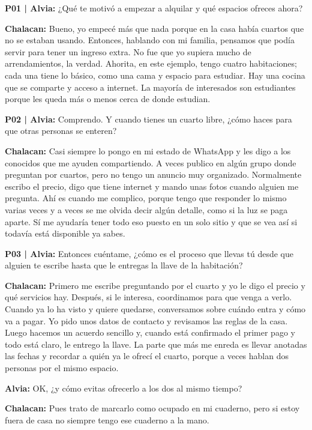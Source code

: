 \documentclass[11pt,a4paper]{article}
\newcommand{\habla}[2]{
    \par\noindent\hspace*{0.8em}\textbf{#1:} #2\par
}
\newcommand{\pregunta}[2]{
    \par\noindent\textbf{P#1 | Alvia:} #2\par
}
\begin{document}
\pregunta{01}{
¿Qué te motivó a empezar a alquilar y qué espacios ofreces ahora?
}

\habla{Chalacan}{
Bueno, yo empecé más que nada porque en la casa había cuartos que no se estaban usando. Entonces, hablando con mi familia, pensamos que podía servir para tener un ingreso extra. No fue que yo supiera mucho de arrendamientos, la verdad. Ahorita, en este ejemplo, tengo cuatro habitaciones; cada una tiene lo básico, como una cama y espacio para estudiar. Hay una cocina que se comparte y acceso a internet. La mayoría de interesados son estudiantes porque les queda más o menos cerca de donde estudian.
}


\pregunta{02}{
Comprendo. Y cuando tienes un cuarto libre, ¿cómo haces para que otras personas se enteren?
}

\habla{Chalacan}{
Casi siempre lo pongo en mi estado de WhatsApp y les digo a los conocidos que me ayuden compartiendo. A veces publico en algún grupo donde preguntan por cuartos, pero no tengo un anuncio muy organizado. Normalmente escribo el precio, digo que tiene internet y mando unas fotos cuando alguien me pregunta. Ahí es cuando me complico, porque tengo que responder lo mismo varias veces y a veces se me olvida decir algún detalle, como si la luz se paga aparte. Sí me ayudaría tener todo eso puesto en un solo sitio y que se vea así si todavía está disponible ya sabes.
}


\pregunta{03}{
Entonces cuéntame, ¿cómo es el proceso que llevas tú desde que alguien te escribe hasta que le entregas la llave de la habitación?
}

\habla{Chalacan}{
Primero me escribe preguntando por el cuarto y yo le digo el precio y qué servicios hay. Después, si le interesa, coordinamos para que venga a verlo. Cuando ya lo ha visto y quiere quedarse, conversamos sobre cuándo entra y cómo va a pagar. Yo pido unos datos de contacto y revisamos las reglas de la casa. Luego hacemos un acuerdo sencillo y, cuando está confirmado el primer pago y todo está claro, le entrego la llave. La parte que más me enreda es llevar anotadas las fechas y recordar a quién ya le ofrecí el cuarto, porque a veces hablan dos personas por el mismo espacio.
}

\habla{Alvia}{
OK, ¿y cómo evitas ofrecerlo a los dos al mismo tiempo?
}

\habla{Chalacan}{
Pues trato de marcarlo como ocupado en mi cuaderno, pero si estoy fuera de casa no siempre tengo ese cuaderno a la mano.
}
\end{document}
